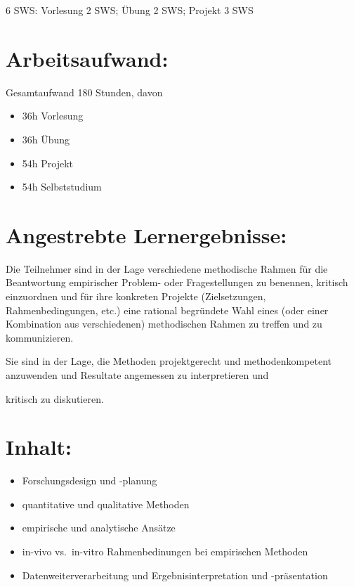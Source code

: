 6 SWS: Vorlesung 2 SWS; Übung 2 SWS; Projekt 3 SWS

\section*{Arbeitsaufwand:}\label{arbeitsaufwand-4}

Gesamtaufwand 180 Stunden, davon

\begin{itemize}
\tightlist
\item
  36h Vorlesung
\item
  36h Übung
\item
  54h Projekt
\item
  54h Selbststudium
\end{itemize}

\section*{Angestrebte
Lernergebnisse:}\label{angestrebte-lernergebnisse-3}

Die Teilnehmer sind in der Lage verschiedene methodische Rahmen für die
Beantwortung empirischer Problem- oder Fragestellungen zu benennen,
kritisch einzuordnen und für ihre konkreten Projekte (Zielsetzungen,
Rahmenbedingungen, etc.) eine rational begründete Wahl eines (oder einer
Kombination aus verschiedenen) methodischen Rahmen zu treffen und zu
kommunizieren.

Sie sind in der Lage, die Methoden projektgerecht und methodenkompetent
anzuwenden und Resultate angemessen zu interpretieren und

kritisch zu diskutieren.

\section*{Inhalt:}\label{inhalt-3}

\begin{itemize}
\tightlist
\item
  Forschungsdesign und -planung
\item
  quantitative und qualitative Methoden
\item
  empirische und analytische Ansätze
\item
  in-vivo vs.~in-vitro Rahmenbedinungen bei empirischen Methoden
\item
  Datenweiterverarbeitung und Ergebnisinterpretation und -präsentation
\end{itemize}

